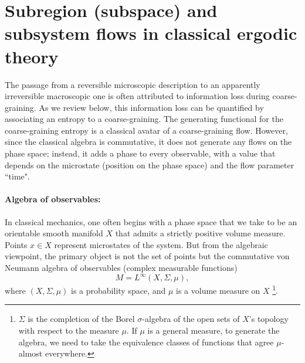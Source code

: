 \documentclass[a4paper,11pt]{article}
\theoremstyle{definition}
\begin{document}
\section{Subregion (subspace) and subsystem flows in classical ergodic theory}


The passage from a reversible microscopic description to an apparently irreversible macroscopic one is often attributed to information loss during coarse-graining. As we review below, this information loss can be quantified by associating an entropy to a coarse-graining. The generating functional for the coarse-graining entropy is a classical avatar of a coarse-graining flow. However, since the classical algebra is commutative, it does not generate any flows on the phase space; instead, it adds a phase to every observable, with a value that depends on the microstate (position on the phase space) and the flow parameter ``time".


\paragraph{Algebra of observables:} In classical mechanics, one often begins with a phase space that we take to be an orientable smooth manifold \(X\) that admits a strictly positive volume measure. Points \(x\in X\) represent microstates of the system. But from the algebraic viewpoint, the primary object is not the set of points but the commutative von Neumann algebra of observables (complex measurable functions)
\[
M=L^\infty(X,\Sigma,\mu),
\]
where \((X,\Sigma,\mu)\) is a probability space, and $\mu$ is a volume measure on $X$ \footnote{$\Sigma$ is the completion of the Borel $\sigma$-algebra of the open sets of $X$'s topology with respect to the measure $\mu$. If $\mu$ is a general measure, to generate the algebra, we need to take the equivalence classes of functions that agree $\mu$-almost everywhere.}.
\end{document}
